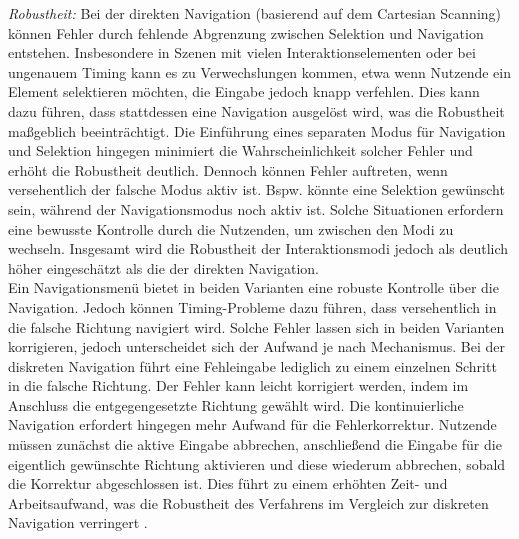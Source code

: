 \textit{Robustheit:}
Bei der direkten Navigation (basierend auf dem Cartesian Scanning) können Fehler durch fehlende Abgrenzung zwischen Selektion und Navigation entstehen. Insbesondere in Szenen mit vielen Interaktionselementen oder bei ungenauem Timing kann es zu Verwechslungen kommen, etwa wenn Nutzende ein Element selektieren möchten, die Eingabe jedoch knapp verfehlen. Dies kann dazu führen, dass stattdessen eine Navigation ausgelöst wird, was die Robustheit maßgeblich beeinträchtigt. Die Einführung eines separaten Modus für Navigation und Selektion hingegen minimiert die Wahrscheinlichkeit solcher Fehler und erhöht die Robustheit deutlich. Dennoch können Fehler auftreten, wenn versehentlich der falsche Modus aktiv ist. Bspw. könnte eine Selektion gewünscht sein, während der Navigationsmodus noch aktiv ist. Solche Situationen erfordern eine bewusste Kontrolle durch die Nutzenden, um zwischen den Modi zu wechseln. Insgesamt wird die Robustheit der Interaktionsmodi jedoch als deutlich höher eingeschätzt als die der direkten Navigation.\\
Ein Navigationsmenü bietet in beiden Varianten eine robuste Kontrolle über die Navigation. Jedoch können Timing-Probleme dazu führen, dass versehentlich in die falsche Richtung navigiert wird. Solche Fehler lassen sich in beiden Varianten korrigieren, jedoch unterscheidet sich der Aufwand je nach Mechanismus. Bei der diskreten Navigation führt eine Fehleingabe lediglich zu einem einzelnen Schritt in die falsche Richtung. Der Fehler kann leicht korrigiert werden, indem im Anschluss die entgegengesetzte Richtung gewählt wird. Die kontinuierliche Navigation erfordert hingegen mehr Aufwand für die Fehlerkorrektur. Nutzende müssen zunächst die aktive Eingabe abbrechen, anschließend die Eingabe für die eigentlich gewünschte Richtung aktivieren und diese wiederum abbrechen, sobald die Korrektur abgeschlossen ist. Dies führt zu einem erhöhten Zeit- und Arbeitsaufwand, was die Robustheit des Verfahrens im Vergleich zur diskreten Navigation verringert \citep{10.1145/2159365.2159386}. 

